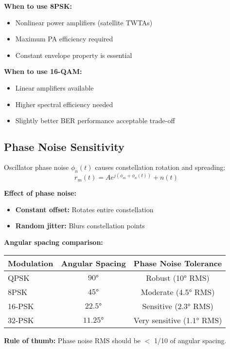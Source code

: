 \textbf{When to use 8PSK:}
\begin{itemize}
\item[\checkmark] Nonlinear power amplifiers (satellite TWTAs)
\item[\checkmark] Maximum PA efficiency required
\item[\checkmark] Constant envelope property is essential
\end{itemize}

\textbf{When to use 16-QAM:}
\begin{itemize}
\item[\checkmark] Linear amplifiers available
\item[\checkmark] Higher spectral efficiency needed
\item[\checkmark] Slightly better BER performance acceptable trade-off
\end{itemize}

\subsection{Phase Noise Sensitivity}

Oscillator phase noise $\phi_n(t)$ causes constellation rotation and spreading:
\begin{equation}
r_m(t) = A e^{j(\phi_m + \phi_n(t))} + n(t)
\end{equation}

\textbf{Effect of phase noise:}
\begin{itemize}
\item \textbf{Constant offset:} Rotates entire constellation
\item \textbf{Random jitter:} Blurs constellation points
\end{itemize}

\textbf{Angular spacing comparison:}
\begin{center}
\begin{tabular}{@{}lcc@{}}
\toprule
Modulation & Angular Spacing & Phase Noise Tolerance \\
\midrule
QPSK & $90°$ & Robust (10° RMS) \\
8PSK & $45°$ & Moderate (4.5° RMS) \\
16-PSK & $22.5°$ & Sensitive (2.3° RMS) \\
32-PSK & $11.25°$ & Very sensitive (1.1° RMS) \\
\bottomrule
\end{tabular}
\end{center}

\textbf{Rule of thumb:} Phase noise RMS should be $<$ 1/10 of angular spacing.


